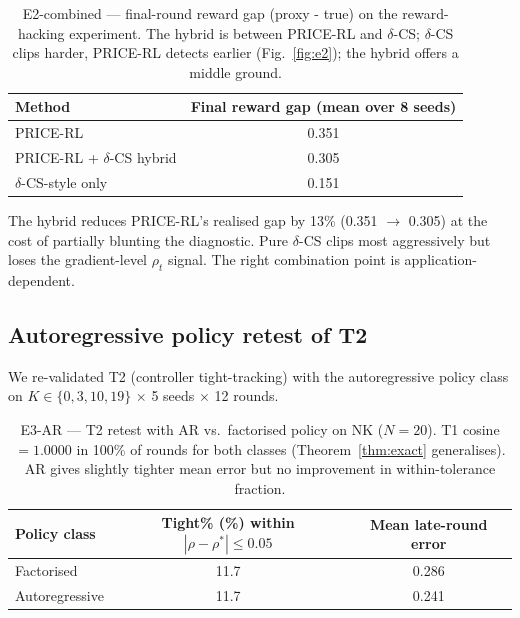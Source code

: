 \begin{table}[t]
\centering
\caption{E2-combined --- final-round reward gap (proxy - true) on the reward-hacking experiment. The hybrid is between PRICE-RL and $\delta$-CS; $\delta$-CS clips harder, PRICE-RL detects earlier (Fig.~\ref{fig:e2}); the hybrid offers a middle ground.}
\label{tab:e2combined}
\begin{tabular}{lc}
\toprule
Method & Final reward gap (mean over 8 seeds) \\
\midrule
PRICE-RL                                   & 0.351 \\
PRICE-RL + $\delta$-CS hybrid              & 0.305 \\
$\delta$-CS-style only                     & 0.151 \\
\bottomrule
\end{tabular}
\end{table}

The hybrid reduces PRICE-RL's realised gap by 13\% (0.351 $\to$ 0.305) at the cost of partially blunting the diagnostic. Pure $\delta$-CS clips most aggressively but loses the gradient-level $\rho_t$ signal. The right combination point is application-dependent.

\subsection{Autoregressive policy retest of T2}
\label{sec:e3ar}

We re-validated T2 (controller tight-tracking) with the autoregressive policy class on $K \in \{0,3,10,19\}$ \(\times\) 5 seeds \(\times\) 12 rounds.

\begin{table}[t]
\centering
\caption{E3-AR --- T2 retest with AR vs.\ factorised policy on NK ($N{=}20$). T1 cosine $= 1.0000$ in 100\% of rounds for both classes (Theorem~\ref{thm:exact} generalises). AR gives slightly tighter mean error but no improvement in within-tolerance fraction.}
\label{tab:e3ar}
\begin{tabular}{lcc}
\toprule
Policy class & Tight\% (\%) within $|\rho - \rho^*| \leq 0.05$ & Mean late-round error \\
\midrule
Factorised                       & 11.7 & 0.286 \\
Autoregressive                   & 11.7 & 0.241 \\
\bottomrule
\end{tabular}
\end{table}

